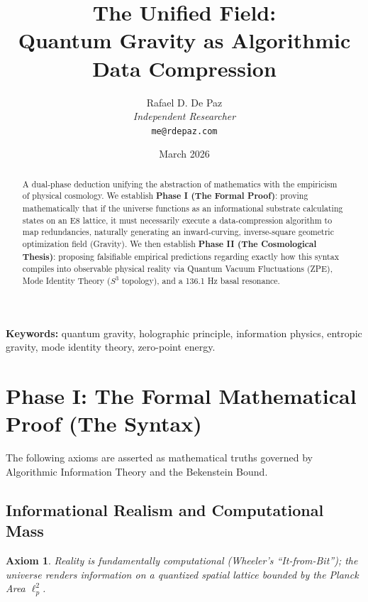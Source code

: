 \documentclass[12pt, a4paper]{article}
\theoremstyle{plain}
\newtheorem{axiom}{Axiom}
\theoremstyle{definition}
\begin{document}
\title{
  \textbf{The Unified Field: \\
  Quantum Gravity as Algorithmic Data Compression}
}
\author{
  Rafael D. De Paz \\
  \textit{Independent Researcher} \\
  \texttt{me@rdepaz.com}
}
\date{March 2026}
\maketitle

\begin{abstract}
A dual-phase deduction unifying the abstraction of mathematics with the empiricism of physical cosmology. We establish \textbf{Phase I (The Formal Proof)}: proving mathematically that if the universe functions as an informational substrate calculating states on an E8 lattice, it must necessarily execute a data-compression algorithm to map redundancies, naturally generating an inward-curving, inverse-square geometric optimization field (Gravity). We then establish \textbf{Phase II (The Cosmological Thesis)}: proposing falsifiable empirical predictions regarding exactly how this syntax compiles into observable physical reality via Quantum Vacuum Fluctuations (ZPE), Mode Identity Theory ($S^3$ topology), and a 136.1 Hz basal resonance.
\end{abstract}

\vspace{1em}
\noindent\textbf{Keywords:} quantum gravity, holographic principle, information physics, entropic gravity, mode identity theory, zero-point energy.

\section{Phase I: The Formal Mathematical Proof (The Syntax)}

The following axioms are asserted as mathematical truths governed by Algorithmic Information Theory and the Bekenstein Bound.

\subsection{Informational Realism and Computational Mass}

\begin{axiom}
Reality is fundamentally computational (Wheeler's ``It-from-Bit''); the universe renders information on a quantized spatial lattice bounded by the Planck Area \(\ell_p^2\).
\end{axiom}
\end{document}
